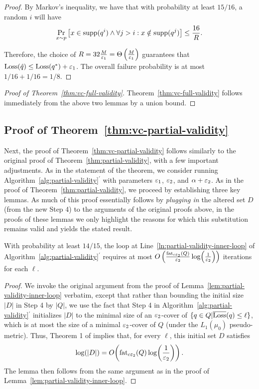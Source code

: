 \begin{proof}
By Markov's inequality, we have that with probability at least $15/16$, 
a random $i$ will have $$\Pr_{x\sim p}\left[ x \in \text{supp}(q^i) \wedge \forall j > i: x \notin \text{supp}(q^j) \right] \le \frac {16} R.$$

Therefore, the choice of $R = 32 \frac M {\varepsilon_1} = \Theta \left( \frac { M } {\varepsilon_1} \right)$ guarantees that $\text{Loss}(\hat q) \le \text{Loss}(q^*) + {\varepsilon_1}$.
The overall failure probability is at most $1/16+ 1/16 = 1/8$.
\end{proof}

\begin{proof}[Proof of Theorem~\ref{thm:vc-full-validity}]
Theorem~\ref{thm:vc-full-validity} follows immediately from the above two lemmas by a union bound.
\end{proof}


\subsection{Proof of Theorem~\ref{thm:vc-partial-validity}}

Next, the proof of Theorem~\ref{thm:vc-partial-validity} follows similarly to the original proof 
of Theorem~\ref{thm:partial-validity}, with a few important adjustments.
As in the statement of the theorem, we consider running Algorithm~\ref{alg:partial-validity}$^{\prime}$ 
with parameters $\varepsilon_{1}$, $\varepsilon_{2}$, and $\alpha+\varepsilon_{2}$.
As in the proof of Theorem~\ref{thm:partial-validity}, we proceed by establishing three key lemmas.
As much of this proof essentially follows by \emph{plugging in} the altered set $D$ (from the new Step 4) 
to the arguments of the original proofs above, in the proofs of these lemmas we only highlight the reasons 
for which this substitution remains valid and yields the stated result.

\begin{lemma}
\label{lem:vc-partial-validity-inner-loop}
With probability at least $14/15$, the loop at Line~\ref{ln:partial-validity-inner-loop} of Algorithm~\ref{alg:partial-validity}$^{\prime}$ 
requires at most $O\left(\frac{{\rm fat}_{c\eps_2}(Q)}{\eps_2} \log\!\left( \frac{1}{\eps_{2}} \right) \right)$ iterations for each $\ell$.
\end{lemma}
\begin{proof}
We invoke the original argument from the proof of Lemma~\ref{lem:partial-validity-inner-loop} verbatim, 
except that rather than bounding the initial size $|D|$ in Step 4 by $|Q|$, 
we use the fact that Step 4 in Algorithm~\ref{alg:partial-validity}$^{\prime}$ initializes $|D|$ 
to the minimal size of an $\varepsilon_{2}$-cover of $\{q \in Q | \overline{\text{Loss}}(q) \leq \ell \}$, 
which is at most the size of a minimal $\varepsilon_{2}$-cover of $Q$ (under the $L_{1}(\mu_{0})$ pseudo-metric).
Thus, Theorem 1 of \cite{MendelsonV03} implies that, for every $\ell$, this initial set $D$ satisfies 
\begin{equation}
\label{eqn:mv-cover-bound}
\log(|D|) = O\!\left( {\rm fat}_{c\eps_{2}}(Q) \log\!\left( \frac{1}{\eps_{2}} \right) \right).
\end{equation}
The lemma then follows from the same argument as in the proof of Lemma~\ref{lem:partial-validity-inner-loop}.
\end{proof}

